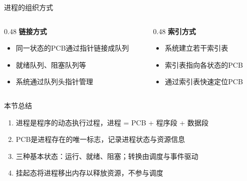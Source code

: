 \documentclass[10pt, aspectratio=169]{beamer}
\begin{document}
\begin{frame}{进程的组织方式}
    \begin{columns}
        \begin{column}{0.48\textwidth}
            \textbf{链接方式}
            \begin{itemize}
                \item 同一状态的PCB通过指针链接成队列
                \item 就绪队列、阻塞队列等
                \item 系统通过队列头指针管理
            \end{itemize}
        \end{column}
        \begin{column}{0.48\textwidth}
            \textbf{索引方式}
            \begin{itemize}
                \item 系统建立若干索引表
                \item 索引表指向各状态的PCB
                \item 通过索引表快速定位PCB
            \end{itemize}
        \end{column}
    \end{columns}
\end{frame}

\begin{frame}{本节总结}
    \begin{enumerate}
        \item 进程是程序的动态执行过程，进程 = PCB + 程序段 + 数据段
        \item PCB是进程存在的唯一标志，记录进程状态与资源信息
        \item 三种基本状态：运行、就绪、阻塞；转换由调度与事件驱动
        \item 挂起态将进程移出内存以释放资源，不参与调度
    \end{enumerate}
\end{frame}
\end{document}
